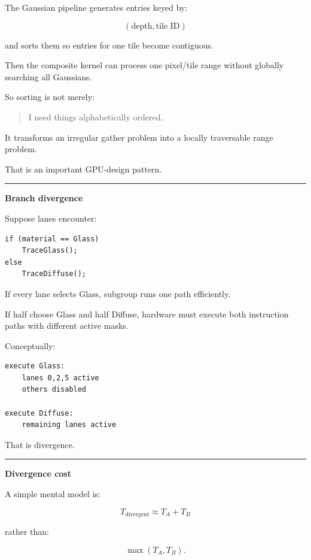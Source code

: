 The Gaussian pipeline generates entries keyed by:

\[
(\text{depth},\text{tile ID})
\]

and sorts them so entries for one tile become contiguous.

Then the composite kernel can process one pixel/tile range without globally searching all Gaussians.

So sorting is not merely:

\begin{quote}
I need things alphabetically ordered.
\end{quote}

It transforms an irregular gather problem into a locally traversable range problem.

That is an important GPU-design pattern.

\begin{center}\rule{0.5\linewidth}{0.5pt}\end{center}

\textbf{Branch divergence}

Suppose lanes encounter:

\protect{}\label{86rlbx}%
\begin{verbatim}
if (material == Glass)
    TraceGlass();
else
    TraceDiffuse();
\end{verbatim}

If every lane selects Glass, subgroup runs one path efficiently.

If half choose Glass and half Diffuse, hardware must execute both instruction paths with different active masks.

Conceptually:

\protect{}\label{c7d0fn}%
\begin{verbatim}
execute Glass:
    lanes 0,2,5 active
    others disabled

execute Diffuse:
    remaining lanes active
\end{verbatim}

That is divergence.

\begin{center}\rule{0.5\linewidth}{0.5pt}\end{center}

\textbf{Divergence cost}

A simple mental model is:

\[
T_{\text{divergent}}
\approx
T_A+T_B
\]

rather than:

\[
\max(T_A,T_B).
\]

